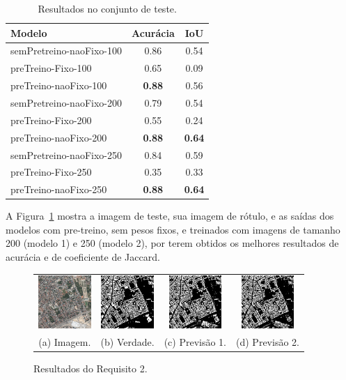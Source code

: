 \documentclass{bmvc2k}
\begin{document}
\begin{table}[htb]
    \small
    \centering
    \begin{tabular}{l|c|c}
        Modelo & Acurácia & IoU \\
        \hline
        semPretreino-naoFixo-100 & 0.86 & 0.54 \\
        preTreino-Fixo-100 & 0.65 & 0.09 \\
        preTreino-naoFixo-100 & \textbf{0.88} & 0.56 \\ 
        semPretreino-naoFixo-200 & 0.79 & 0.54 \\
        preTreino-Fixo-200 & 0.55 & 0.24 \\
        preTreino-naoFixo-200 & \textbf{0.88} & \textbf{0.64} \\
        semPretreino-naoFixo-250 & 0.84 & 0.59 \\
        preTreino-Fixo-250 &  0.35 & 0.33 \\
        preTreino-naoFixo-250 & \textbf{0.88} & \textbf{0.64} \\
    \end{tabular}
    \caption{Resultados no conjunto de teste.}
    \label{tab:results2}
\end{table}

A Figura~\ref{fig:results2} mostra a imagem de teste, sua imagem de rótulo, e as saídas dos modelos com pre-treino, sem pesos fixos, e treinados com imagens de tamanho 200 (modelo 1) e 250 (modelo 2), por terem obtidos os melhores resultados de acurácia e de coeficiente de Jaccard. 

\begin{figure}[htb]
\centering
\begin{tabular}{cccc}
  \includegraphics[width=20mm]{figs/test.jpg} &   \includegraphics[width=20mm]{figs/test_label.jpg} &   \includegraphics[width=20mm]{figs/pred200.jpg} & 
  \includegraphics[width=20mm]{figs/pred250.jpg} \\ 
(a) Imagem. & (b) Verdade. & (c) Previsão 1. & (d) Previsão 2. \\[6pt]
\end{tabular}
\caption{Resultados do Requisito 2.}
\label{fig:results2}
\end{figure}
\end{document}

